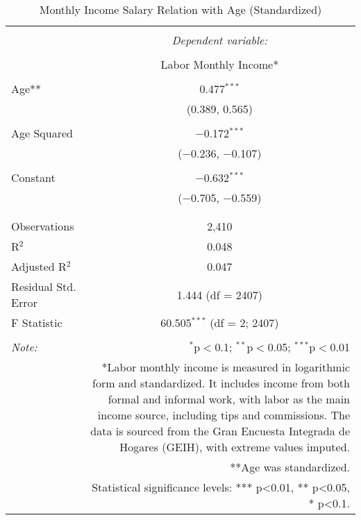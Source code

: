 
\begin{table}[!htbp] \centering 
  \caption{Monthly Income Salary Relation with Age (Standardized)} 
  \label{} 
\begin{tabular}{@{\extracolsep{5pt}}lc} 
\\[-1.8ex]\hline 
\hline \\[-1.8ex] 
 & \multicolumn{1}{c}{\textit{Dependent variable:}} \\ 
\cline{2-2} 
\\[-1.8ex] & Labor Monthly Income* \\ 
\hline \\[-1.8ex] 
 Age** & 0.477$^{***}$ \\ 
  & (0.389, 0.565) \\ 
  & \\ 
 Age Squared & $-$0.172$^{***}$ \\ 
  & ($-$0.236, $-$0.107) \\ 
  & \\ 
 Constant & $-$0.632$^{***}$ \\ 
  & ($-$0.705, $-$0.559) \\ 
  & \\ 
\hline \\[-1.8ex] 
Observations & 2,410 \\ 
R$^{2}$ & 0.048 \\ 
Adjusted R$^{2}$ & 0.047 \\ 
Residual Std. Error & 1.444 (df = 2407) \\ 
F Statistic & 60.505$^{***}$ (df = 2; 2407) \\ 
\hline 
\hline \\[-1.8ex] 
\textit{Note:}  & \multicolumn{1}{r}{$^{*}$p$<$0.1; $^{**}$p$<$0.05; $^{***}$p$<$0.01} \\ 
 & \multicolumn{1}{r}{*Labor monthly income is measured in logarithmic form and standardized. It includes income from both formal and informal work, with labor as the main income source, including tips and commissions. The data is sourced from the Gran Encuesta Integrada de Hogares (GEIH), with extreme values imputed.} \\ 
 & \multicolumn{1}{r}{**Age was standardized.} \\ 
 & \multicolumn{1}{r}{Statistical significance levels: *** p<0.01, ** p<0.05, * p<0.1.} \\ 
\end{tabular} 
\end{table} 
